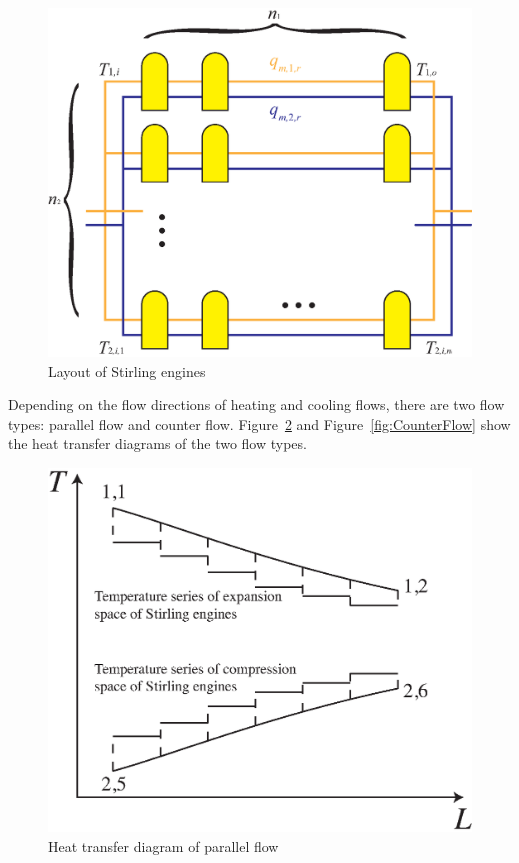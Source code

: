\documentclass{article}
\begin{document}
\noindent \begin{figure}[htbp]
\begin{center}
	\includegraphics[width = 0.7\columnwidth]{./graphics/StirlingEngineArray}
	\caption{Layout of Stirling engines}
	\label{fig:Layout of Stirling engines}
\end{center}
\end{figure}

Depending on the flow directions of heating and cooling flows, there are two flow types: parallel flow and counter flow. Figure~\ref{fig:ParallelFlow} and Figure~\ref{fig:CounterFlow} show the heat transfer diagrams of the two flow types.

\noindent \begin{figure}[htbp]
\begin{center}
	\includegraphics[width = 0.7\columnwidth]{./graphics/HeatTransfer_Parallel}
	\caption{Heat transfer diagram of parallel flow}
	\label{fig:ParallelFlow}
\end{center}
\end{figure}
\end{document}
